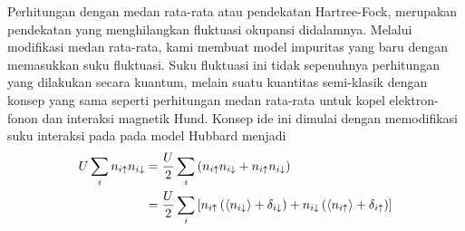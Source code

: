 Perhitungan dengan medan rata-rata atau pendekatan Hartree-Fock, merupakan pendekatan yang menghilangkan fluktuasi okupansi didalamnya. Melalui modifikasi medan rata-rata, kami membuat model impuritas yang baru dengan memasukkan suku fluktuasi. Suku fluktuasi ini tidak sepenuhnya perhitungan yang dilakukan secara kuantum, melain suatu kuantitas semi-klasik dengan konsep yang sama seperti perhitungan medan rata-rata untuk kopel elektron-fonon\cite{el-ph} dan interaksi magnetik Hund\cite{hund}. Konsep ide ini dimulai dengan memodifikasi suku interaksi pada pada model Hubbard menjadi
\begin{align}
U \sum_i n_{i\uparrow} n _{i\downarrow} &= \frac{U}{2} \sum_i \left( n_{i\uparrow} n _{i\downarrow} + n_{i\uparrow} n _{i\downarrow} \right)\notag\\
&= \frac{U}{2} \sum_i \left[ n_{i\uparrow} \left(\left< n _{i\downarrow} \right> + \delta_{i\downarrow} \right) + n _{i\downarrow} \left( \left< n_{i\uparrow} \right> + \delta_{i\uparrow} \right) \right]
\end{align}

